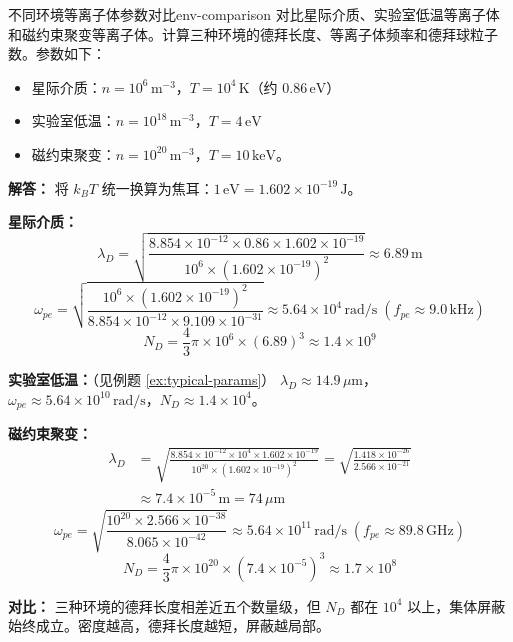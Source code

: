 \begin{example}{不同环境等离子体参数对比}{env-comparison}
对比星际介质、实验室低温等离子体和磁约束聚变等离子体。计算三种环境的德拜长度、等离子体频率和德拜球粒子数。参数如下：
\begin{itemize}[leftmargin=*,itemsep=0pt]
\item 星际介质：$n = 10^{6}\,\mathrm{m}^{-3}$，$T = 10^{4}\,\mathrm{K}$（约 $0.86\,\mathrm{eV}$）
\item 实验室低温：$n = 10^{18}\,\mathrm{m}^{-3}$，$T = 4\,\mathrm{eV}$
\item 磁约束聚变：$n = 10^{20}\,\mathrm{m}^{-3}$，$T = 10\,\mathrm{keV}$。
\end{itemize}
\tcblower
\textbf{解答：}
将 $k_{\!B}T$ 统一换算为焦耳：$1\,\mathrm{eV}=1.602\times 10^{-19}\,\mathrm{J}$。

\textbf{星际介质：}
\[
\lambda_D = \sqrt{\frac{8.854\times 10^{-12}\times 0.86\times 1.602\times 10^{-19}}{10^6\times (1.602\times 10^{-19})^2}} \approx 6.89\,\mathrm{m}
\]
\[
\omega_{pe} = \sqrt{\frac{10^6\times (1.602\times 10^{-19})^2}{8.854\times 10^{-12}\times 9.109\times 10^{-31}}} \approx 5.64\times 10^{4}\,\mathrm{rad/s}\;(f_{pe}\approx 9.0\,\mathrm{kHz})
\]
\[
N_D = \frac{4}{3}\pi\times 10^6\times (6.89)^3 \approx 1.4\times 10^{9}
\]

\textbf{实验室低温：}（见例题 \ref{ex:typical-params}）
$\lambda_D\approx 14.9\,\mu\mathrm{m}$，$\omega_{pe}\approx 5.64\times 10^{10}\,\mathrm{rad/s}$，$N_D\approx 1.4\times 10^4$。

\textbf{磁约束聚变：}
\[
\begin{aligned}
\lambda_D &= \sqrt{\frac{8.854\times 10^{-12}\times 10^4\times 1.602\times 10^{-19}}
                        {10^{20}\times (1.602\times 10^{-19})^2}}
          = \sqrt{\frac{1.418\times 10^{-26}}{2.566\times 10^{-21}}} \\
          &\approx 7.4\times 10^{-5}\,\mathrm{m} = 74\,\mu\mathrm{m}
\end{aligned}
\]
\[
\omega_{pe} = \sqrt{\frac{10^{20}\times 2.566\times 10^{-38}}{8.065\times 10^{-42}}} \approx 5.64\times 10^{11}\,\mathrm{rad/s}\;(f_{pe}\approx 89.8\,\mathrm{GHz})
\]
\[
N_D = \frac{4}{3}\pi\times 10^{20}\times (7.4\times 10^{-5})^3 \approx 1.7\times 10^{8}
\]

\textbf{对比：} 三种环境的德拜长度相差近五个数量级，但 $N_D$ 都在 $10^{4}$ 以上，集体屏蔽始终成立。密度越高，德拜长度越短，屏蔽越局部。
\end{example}

